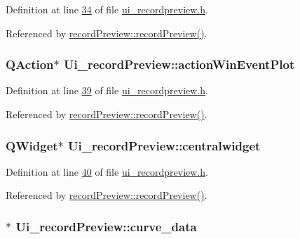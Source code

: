 Definition at line \hyperlink{a00140_source_l00034}{34} of file \hyperlink{a00140_source}{ui\+\_\+recordpreview.\+h}.



Referenced by \hyperlink{a00129_source_l00011}{record\+Preview\+::record\+Preview()}.

\hypertarget{a00081_ac72ec9c8679d46fd43a87f99ee6db893}{
\subsubsection[{action\+Win\+Event\+Plot}]{\setlength{\rightskip}{0pt plus 5cm}Q\+Action$\ast$ Ui\+\_\+record\+Preview\+::action\+Win\+Event\+Plot}}\label{a00081_ac72ec9c8679d46fd43a87f99ee6db893}


Definition at line \hyperlink{a00140_source_l00039}{39} of file \hyperlink{a00140_source}{ui\+\_\+recordpreview.\+h}.



Referenced by \hyperlink{a00129_source_l00011}{record\+Preview\+::record\+Preview()}.

\hypertarget{a00081_ac9ab4609922159e8e4cc45905f76928e}{
\subsubsection[{centralwidget}]{\setlength{\rightskip}{0pt plus 5cm}Q\+Widget$\ast$ Ui\+\_\+record\+Preview\+::centralwidget}}\label{a00081_ac9ab4609922159e8e4cc45905f76928e}


Definition at line \hyperlink{a00140_source_l00040}{40} of file \hyperlink{a00140_source}{ui\+\_\+recordpreview.\+h}.



Referenced by \hyperlink{a00129_source_l00011}{record\+Preview\+::record\+Preview()}.

\hypertarget{a00081_a247d94481323c0bc4f8b6458a8a535dd}{
\subsubsection[{curve\+\_\+data}]{$\ast$ Ui\+\_\+record\+Preview\+::curve\+\_\+data}}\label{a00081_a247d94481323c0bc4f8b6458a8a535dd}


